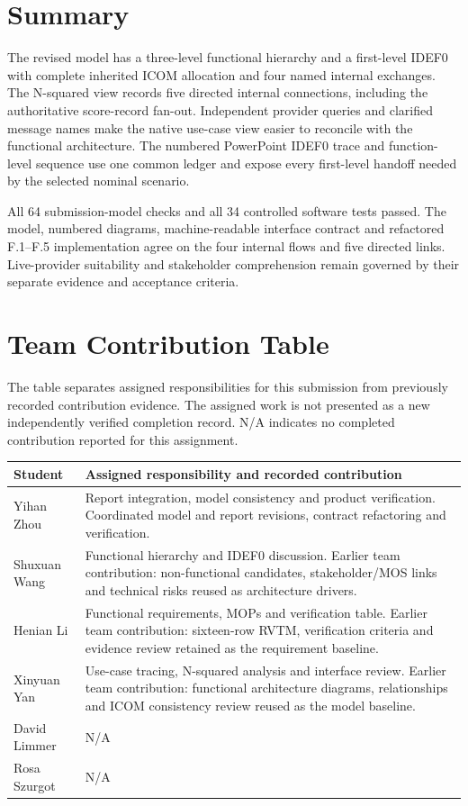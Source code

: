 \documentclass[11pt,letterpaper]{article}
\begin{document}
\section{Summary}
The revised model has a three-level functional hierarchy and a first-level IDEF0 with complete inherited ICOM allocation and four named internal exchanges. The N-squared view records five directed internal connections, including the authoritative score-record fan-out. Independent provider queries and clarified message names make the native use-case view easier to reconcile with the functional architecture. The numbered PowerPoint IDEF0 trace and function-level sequence use one common ledger and expose every first-level handoff needed by the selected nominal scenario.

All 64 submission-model checks and all 34 controlled software tests passed. The model, numbered diagrams, machine-readable interface contract and refactored F.1--F.5 implementation agree on the four internal flows and five directed links. Live-provider suitability and stakeholder comprehension remain governed by their separate evidence and acceptance criteria.

\section{Team Contribution Table}
The table separates assigned responsibilities for this submission from previously recorded contribution evidence. The assigned work is not presented as a new independently verified completion record. N/A indicates no completed contribution reported for this assignment.
\par\noindent\begin{tabularx}{\linewidth}{@{}p{.22\linewidth}X@{}}\toprule
Student & Assigned responsibility and recorded contribution\\\midrule
Yihan Zhou & Report integration, model consistency and product verification. Coordinated model and report revisions, contract refactoring and verification.\\
Shuxuan Wang & Functional hierarchy and IDEF0 discussion. Earlier team contribution: non-functional candidates, stakeholder/MOS links and technical risks reused as architecture drivers.\\
Henian Li & Functional requirements, MOPs and verification table. Earlier team contribution: sixteen-row RVTM, verification criteria and evidence review retained as the requirement baseline.\\
Xinyuan Yan & Use-case tracing, N-squared analysis and interface review. Earlier team contribution: functional architecture diagrams, relationships and ICOM consistency review reused as the model baseline.\\
David Limmer & N/A\\
Rosa Szurgot & N/A\\\bottomrule\end{tabularx}\par
\end{document}
